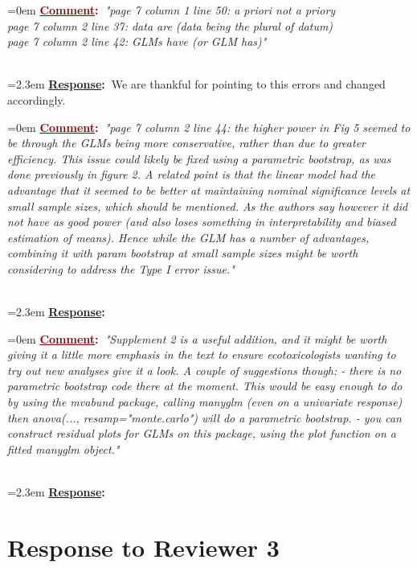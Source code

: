 \documentclass[12pt]{article}
\newcommand{\comment}[1]{
	\vspace{2em} \noindent \hangindent=0em \textbf{\textcolor{Maroon}{\uline{Comment}:~}}\emph{"#1"}
	}
\newcommand{\response}[1]{
	\\[0.25em] 
	\hangindent=2.3em \textbf{\textcolor{NavyBlue}{\uline{Response}:~}}#1 
	}
\begin{document}
\comment{page 7 column 1 line 50: a priori not a priory\\
page 7 column 2 line 37: data are (data being the plural of datum)\\
page 7 column 2 line 42: GLMs have (or GLM has)}
\response{We are thankful for pointing to this errors and changed accordingly.}

\comment{page 7 column 2 line 44: the higher power in Fig 5 seemed to be through the GLMs being more conservative, rather than due to greater efficiency.  This issue could likely be fixed using a parametric bootstrap, as was done previously in figure 2.
A related point is that the linear model had the advantage that it seemed to be better at maintaining nominal significance levels at small sample sizes, which should be mentioned.  As the authors say however it did not have as good power (and also loses something in interpretability and biased estimation of means).  Hence while the GLM has a number of advantages, combining it with param bootstrap at small sample sizes might be worth considering to address the Type I error issue.}
\response{}

\comment{Supplement 2 is a useful addition, and it might be worth giving it a little more emphasis in the text to ensure ecotoxicologists wanting to try out new analyses give it a look.  A couple of suggestions though:
- there is no parametric bootstrap code there at the moment.  This would be easy enough to do by using the mvabund package, calling manyglm (even on a univariate response) then anova(..., resamp="monte.carlo")  will do a parametric bootstrap.
- you can construct residual plots for GLMs on this package, using the plot function on a fitted manyglm object.}
\response{}


\section{Response to Reviewer 3}
\end{document}
